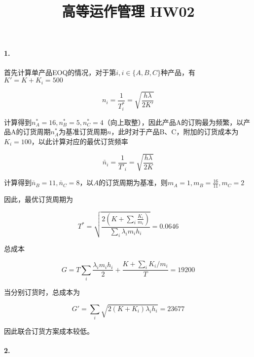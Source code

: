 \documentclass{../notes}
\title{高等运作管理 HW02}
\begin{document}
    \maketitle

    \paragraph*{1.} 首先计算单产品EOQ的情况，对于第$i, i\in \{A, B, C\}$种产品，有$K' = K + K_i = 500$

    \begin{equation}
        n_i = \frac{1}{T^*_i} = \sqrt{\frac{h\lambda }{2K'}}
    \end{equation}

    计算得到$n_A^* = 16, n_B^* = 5, n_C^* = 4$（向上取整），因此产品A的订购最为频繁，以产品A的订货周期$n_A^*$为基准订货周期$n$，此时对于产品B、C，附加的订货成本为$K_i = 100$，以此计算对应的最优订货频率

    \begin{equation}
        \bar n_i = \frac{1}{T'_i} = \sqrt{\frac{h\lambda }{2K}}
    \end{equation}

    计算得到$\bar n_B = 11, \bar n_C = 8$，以$A$的订货周期为基准，则$m_A = 1, m_B = \frac{16}{11}, m_C = 2$

    因此，最优订货周期为

    \begin{equation}
        T^* = \sqrt{\frac{2\left(K + \sum_i \frac{K_i}{m_i}\right)}{\sum_i \lambda_i m_i h_i}} = 0.0646
    \end{equation}

    总成本

    \begin{equation}
        G = T\sum_{i} \frac{\lambda_im_ih_i}{2} + \frac{K+\sum_i K_i/m_i}{T} = 19200
    \end{equation}

    当分别订货时，总成本为

    \begin{equation}
        G' = \sum_i \sqrt{2(K + K_i)\lambda_i h_i} = 23677
    \end{equation}

    因此联合订货方案成本较低。

    \separate

    \paragraph*{2.} 
\end{document}
